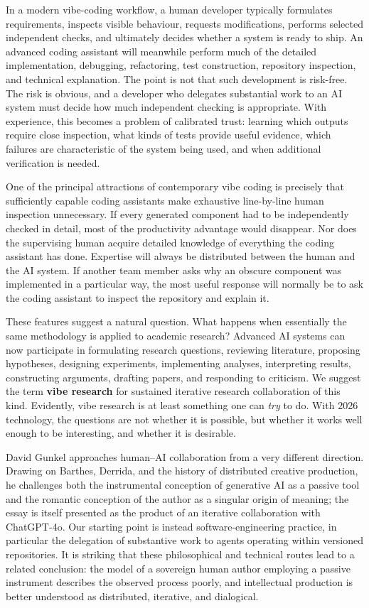 \documentclass[12pt]{article}
\begin{document}
In a modern vibe-coding workflow, a human developer typically formulates requirements, inspects visible behaviour, requests modifications, performs selected independent checks, and ultimately decides whether a system is ready to ship. An advanced coding assistant will meanwhile perform much of the detailed implementation, debugging, refactoring, test construction, repository inspection, and technical explanation.
The point is not that such development is risk-free. The risk is obvious, and a developer who delegates substantial work to an AI system must decide how much independent checking is appropriate. With experience, this becomes a problem of calibrated trust: learning which outputs require close inspection, what kinds of tests provide useful evidence, which failures are characteristic of the system being used, and when additional verification is needed.

One of the principal attractions of contemporary vibe coding is precisely that sufficiently capable coding assistants make exhaustive line-by-line human inspection unnecessary. If every generated component had to be independently checked in detail, most of the productivity advantage would disappear.
Nor does the supervising human acquire detailed knowledge of everything the coding assistant has done. Expertise will always be distributed between the human and the AI system. If another team member asks why an obscure component was implemented in a particular way, the most useful response will normally be to ask the coding assistant to inspect the repository and explain it.

These features suggest a natural question. What happens when essentially the same methodology is applied to academic research?
Advanced AI systems can now participate in formulating research questions, reviewing literature, proposing hypotheses, designing experiments, implementing analyses, interpreting results, constructing arguments, drafting papers, and responding to criticism. We suggest the term \textbf{vibe research} for sustained iterative research collaboration of this kind. Evidently, vibe research is at least something one can \textit{try} to do. With 2026 technology, the questions are not whether it is possible, but whether it works well enough to be interesting, and whether it is desirable.

David Gunkel \citeyearpar{gunkel2025prompted} approaches human--AI collaboration from a very different direction. Drawing on Barthes, Derrida, and the history of distributed creative production, he challenges both the instrumental conception of generative AI as a passive tool and the romantic conception of the author as a singular origin of meaning; the essay is itself presented as the product of an iterative collaboration with ChatGPT-4o. Our starting point is instead software-engineering practice, in particular the delegation of substantive work to agents operating within versioned repositories. It is striking that these philosophical and technical routes lead to a related conclusion: the model of a sovereign human author employing a passive instrument describes the observed process poorly, and intellectual production is better understood as distributed, iterative, and dialogical.
\end{document}
